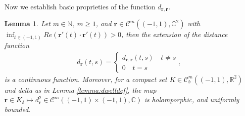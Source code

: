 \documentclass{article}
\newtheorem{lemma}[theorem]{Lemma}
\newcommand{\IC}{{\mathbb C}}
\newcommand{\IN}{{\mathbb N}}
\newcommand{\IR}{{\mathbb R}}
\newcommand{\cmspace}[3]{\mathcal{C}^{#1} \left( #2, #3 \right)}
\newcommand{\rgeo}[1]{\mathcal{C}_b^{#1}\left( (-1,1), \IR^2 \right)}
\newcommand{\cgeo}[1]{\mathcal{C}^{#1}\left( (-1,1), \IC^2 \right)}
\newcommand{\br}{\bm{r}}
\begin{document}
Now we establish basic proprieties of the function $d_{\br,\br}$. 

\begin{lemma}
\label{lemma:dself}
Let $m \in \IN$, $m\geq 1$, and $\br \in  \cgeo{m}$ with $\inf_{t \in (-1,1)}Re(\br'(t) \cdot \br'(t)) >0$, then the extension of the distance function 
\begin{align*}
d_{\br} (t,s) = \begin{cases} d_{\br,\br}(t,s) \quad t\neq s \\ 
0 \quad t=s \end{cases},
\end{align*} 
is a continuous function. Moreover, for a compact set $K \in \rgeo{m}$ and delta as in Lemma \ref{lemma:dwelldef}, the map $\br \in K_\delta \mapsto d_{\br}^2 \in \cmspace{m}{(-1,1)\times(-1,1)}{\IC}$ is holomporphic, and uniformly bounded.   
\end{lemma}
\end{document}

